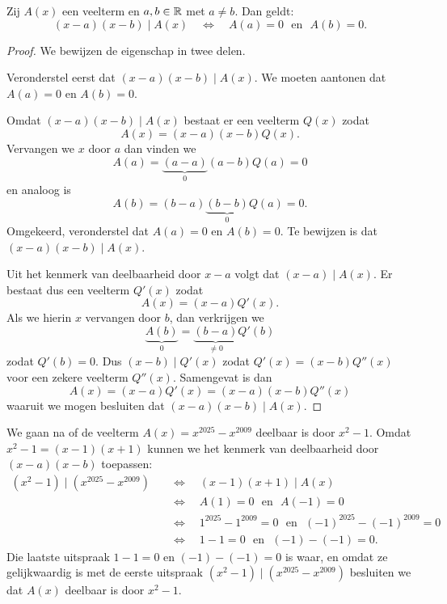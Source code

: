 \documentclass{ximera}
\begin{document}
\begin{stelling} 
Zij $A(x)$ een veelterm en $a,b \in \mathbb{R}$ met $a \neq b$. Dan geldt:
\[
(x-a)(x-b) \mid A(x) \quad \Leftrightarrow \quad A(a) = 0 \,\, \text{ en } \,\, A(b) = 0.
\]
\end{stelling}
\begin{Uitbreiding}
\begin{proof}
We bewijzen de eigenschap in twee delen.

Veronderstel eerst dat $(x-a)(x-b) \mid A(x)$. We moeten aantonen dat $A(a) = 0$ en $A(b) = 0$.

Omdat $(x-a)(x-b) \mid A(x)$ bestaat er een veelterm $Q(x)$ zodat
\[
A(x) = (x-a)(x-b)Q(x).
\]
Vervangen we $x$ door $a$ dan vinden we 
\[
A(a) = \underbrace{(a-a)}_{0}(a-b)Q(a) = 0
\]
en analoog is
\[
A(b) = (b-a)\underbrace{(b-b)}_{0}Q(a) = 0.
\]
Omgekeerd, veronderstel dat $A(a) = 0$ en $A(b) = 0$. Te bewijzen is dat $(x-a)(x-b) \mid A(x)$.

Uit het kenmerk van deelbaarheid door $x-a$ volgt dat $(x-a) \mid A(x)$. Er bestaat dus een veelterm $Q'(x)$ zodat
\[
A(x) = (x-a)Q'(x).
\]
Als we hierin $x$ vervangen door $b$, dan verkrijgen we 
\[
\underbrace{A(b)}_{0} = \underbrace{(b - a)}_{\neq 0} Q'(b)
\]
zodat $Q'(b) = 0$. Dus $(x-b) \mid Q'(x)$ zodat $Q'(x) = (x-b)Q''(x)$ voor een zekere veelterm $Q''(x)$. Samengevat is dan
\[
A(x) = (x-a)Q'(x) = (x-a)(x-b)Q''(x)
\]
waaruit we mogen besluiten dat $(x-a)(x-b) \mid A(x)$.
\end{proof}
\end{Uitbreiding}

\begin{example}
We gaan na of de veelterm $A(x) = x^{2025} - x^{2009}$ deelbaar is door $x^2 - 1$. Omdat $x^2-1 = (x-1)(x+1)$ kunnen we het kenmerk van deelbaarheid door $(x-a)(x-b)$ toepassen:
\begin{align*}
(x^2-1) \mid (x^{2025} - x^{2009}) \quad 
& \Leftrightarrow \quad (x-1)(x+1) \mid A(x) \\
& \Leftrightarrow \quad A(1) = 0 \,\, \text{ en } \,\, A(-1) = 0 \\
& \Leftrightarrow \quad 1^{2025} - 1^{2009} = 0 \,\, \text{ en } \,\, (-1)^{2025} - (-1)^{2009} = 0 \\
& \Leftrightarrow \quad 1 - 1 = 0 \,\, \text{ en } \,\, (-1) - (-1) = 0.
\end{align*}
Die laatste uitspraak $1 - 1 = 0$ en $(-1) - (-1) = 0$ is waar, en omdat ze gelijkwaardig is met de eerste uitspraak $(x^2-1) \mid (x^{2025} - x^{2009})$ besluiten we dat $A(x)$ deelbaar is door $x^2-1$. 
\end{example}
\end{document}
